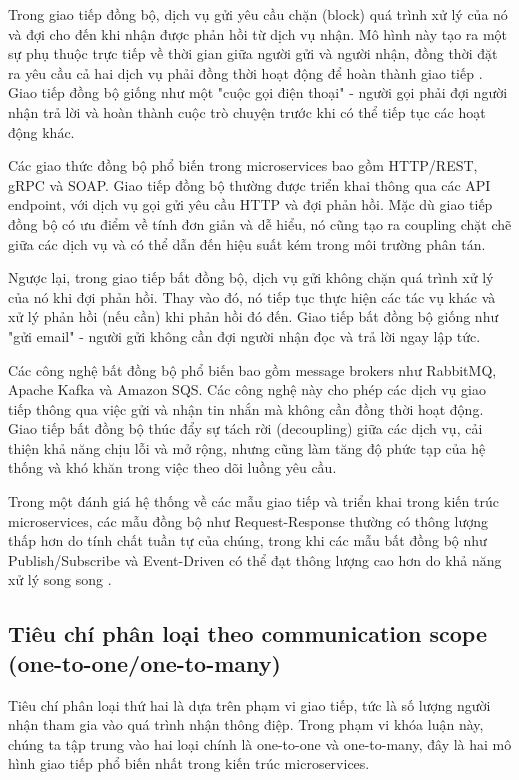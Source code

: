 Trong giao tiếp đồng bộ, dịch vụ gửi yêu cầu chặn (block) quá trình xử lý của nó và đợi cho đến khi nhận được phản hồi từ dịch vụ nhận. Mô hình này tạo ra một sự phụ thuộc trực tiếp về thời gian giữa người gửi và người nhận, đồng thời đặt ra yêu cầu cả hai dịch vụ phải đồng thời hoạt động để hoàn thành giao tiếp \cite{newman2015}. Giao tiếp đồng bộ giống như một "cuộc gọi điện thoại" - người gọi phải đợi người nhận trả lời và hoàn thành cuộc trò chuyện trước khi có thể tiếp tục các hoạt động khác.

Các giao thức đồng bộ phổ biến trong microservices bao gồm HTTP/REST, gRPC và SOAP. Giao tiếp đồng bộ thường được triển khai thông qua các API endpoint, với dịch vụ gọi gửi yêu cầu HTTP và đợi phản hồi. Mặc dù giao tiếp đồng bộ có ưu điểm về tính đơn giản và dễ hiểu, nó cũng tạo ra coupling chặt chẽ giữa các dịch vụ và có thể dẫn đến hiệu suất kém trong môi trường phân tán.

Ngược lại, trong giao tiếp bất đồng bộ, dịch vụ gửi không chặn quá trình xử lý của nó khi đợi phản hồi. Thay vào đó, nó tiếp tục thực hiện các tác vụ khác và xử lý phản hồi (nếu cần) khi phản hồi đó đến. Giao tiếp bất đồng bộ giống như "gửi email" - người gửi không cần đợi người nhận đọc và trả lời ngay lập tức.

Các công nghệ bất đồng bộ phổ biến bao gồm message brokers như RabbitMQ, Apache Kafka và Amazon SQS. Các công nghệ này cho phép các dịch vụ giao tiếp thông qua việc gửi và nhận tin nhắn mà không cần đồng thời hoạt động. Giao tiếp bất đồng bộ thúc đẩy sự tách rời (decoupling) giữa các dịch vụ, cải thiện khả năng chịu lỗi và mở rộng, nhưng cũng làm tăng độ phức tạp của hệ thống và khó khăn trong việc theo dõi luồng yêu cầu.

Trong một đánh giá hệ thống về các mẫu giao tiếp và triển khai trong kiến trúc microservices, các mẫu đồng bộ như Request-Response thường có thông lượng thấp hơn do tính chất tuần tự của chúng, trong khi các mẫu bất đồng bộ như Publish/Subscribe và Event-Driven có thể đạt thông lượng cao hơn do khả năng xử lý song song \cite{aksakalli2021}.

\subsection{Tiêu chí phân loại theo communication scope (one-to-one/one-to-many)}
Tiêu chí phân loại thứ hai là dựa trên phạm vi giao tiếp, tức là số lượng người nhận tham gia vào quá trình nhận thông điệp. Trong phạm vi khóa luận này, chúng ta tập trung vào hai loại chính là one-to-one và one-to-many, đây là hai mô hình giao tiếp phổ biến nhất trong kiến trúc microservices.

